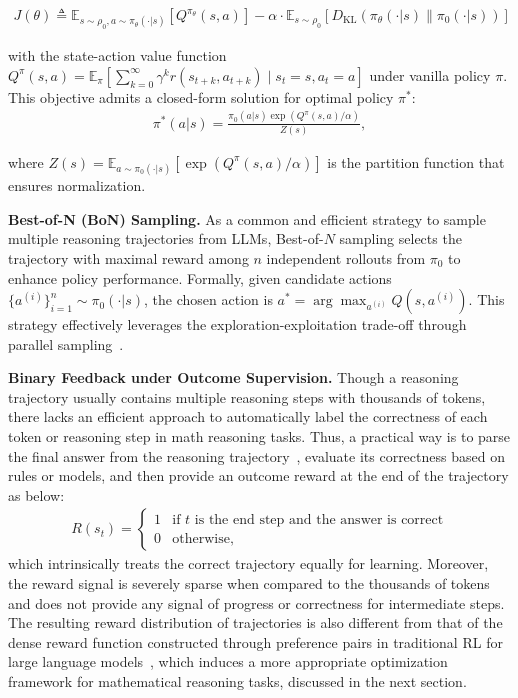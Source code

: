 \begin{align}\label{eq: klpg}
J(\theta) \triangleq \mathbb{E}_{s \sim \rho_0, a \sim \pi_\theta(\cdot|s)}\left[ Q^{\pi_\theta}(s, a) \right] - \alpha \cdot \mathbb{E}_{s \sim \rho_0}\left[ D_{\text{KL}}\left(\pi_\theta(\cdot|s) \| \pi_0(\cdot|s)\right)\right]
\end{align}

with the state-action value function \(Q^{\pi}(s,a) = \mathbb{E}_{\pi}\left[\sum_{k=0}^\infty \gamma^k r(s_{t+k}, a_{t+k}) \mid s_t = s, a_t = a\right]\) under vanilla policy \(\pi\). This objective admits a closed-form solution for optimal policy \(\pi^*\):  
\begin{align}\label{eq: solution}
    \pi^*(a|s) = \frac{\pi_0(a|s) \exp\left( Q^{\pi}(s,a)/\alpha \right)}{Z(s)},
\end{align}

where \(Z(s) = \mathbb{E}_{a \sim \pi_0(\cdot|s)}\left[\exp\left( Q^{\pi}(s,a)/\alpha \right)\right]\) is the partition function that ensures normalization.  

\textbf{Best-of-N (BoN) Sampling.} As a common and efficient strategy to sample multiple reasoning trajectories from LLMs, Best-of-\(N\) sampling selects the trajectory with maximal reward among \(n\) independent rollouts from \(\pi_0\) to enhance policy performance. Formally, given candidate actions \(\{a^{(i)}\}_{i=1}^n \sim \pi_0(\cdot|s)\), the chosen action is \(a^* = \arg\max_{a^{(i)}} Q(s,a^{(i)})\). This strategy effectively leverages the exploration-exploitation trade-off through parallel sampling~\cite{gao2023scaling, go2023compositional}.  

\textbf{Binary Feedback under Outcome Supervision.}
Though a reasoning trajectory usually contains multiple reasoning steps with thousands of tokens, there lacks an efficient approach to automatically label the correctness of each token or reasoning step in math reasoning tasks.
Thus, a practical way is to parse the final answer from the reasoning trajectory~\cite{deepseekr1, lambert2024t}, evaluate its correctness based on rules or models, and then provide an outcome reward at the end of the trajectory as below:
\begin{align}\label{eq:orm}
    R(s_t) = \begin{cases} 
1 & \text{if \(t\) is the end step and the answer is correct} \\
0 & \text{otherwise},
\end{cases} 
\end{align}
which intrinsically treats the correct trajectory equally for learning. Moreover, the reward signal is severely sparse when compared to the thousands of tokens and does not provide any signal of progress or correctness for intermediate steps.
The resulting reward distribution of trajectories is also different from that of the dense reward function constructed through preference pairs in traditional RL for large language models~\cite{ouyang2022training}, which induces a more appropriate optimization framework for mathematical reasoning tasks, discussed in the next section.


